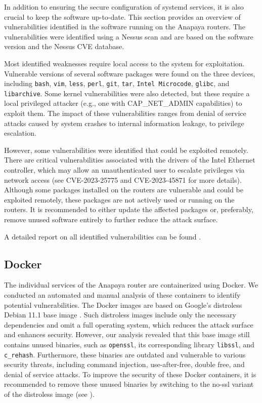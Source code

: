 In addition to ensuring the secure configuration of systemd services, it is also crucial to keep the software up-to-date.
This section provides an overview of vulnerabilities identified in the software running on the Anapaya routers.
The vulnerabilities were identified using a Nessus scan and are based on the software version and the Nessus CVE database.

Most identified weaknesses require local access to the system for exploitation.
Vulnerable versions of several software packages were found on the three devices, including \texttt{bash}, \texttt{vim}, \texttt{less}, \texttt{perl}, \texttt{git}, \texttt{tar}, \texttt{Intel Microcode}, \texttt{glibc}, and \texttt{libarchive}.
Some kernel vulnerabilities were also detected, but these require a local privileged attacker (e.g., one with CAP\_NET\_ADMIN capabilities) to exploit them.
The impact of these vulnerabilities ranges from denial of service attacks caused by system crashes to internal information leakage, to privilege escalation.

However, some vulnerabilities were identified that could be exploited remotely.
There are critical vulnerabilities associated with the drivers of the Intel Ethernet controller, which may allow an unauthenticated user to escalate privileges via network access (see CVE-2023-25775 and CVE-2023-45871 for more details).
Although some packages installed on the routers are vulnerable and could be exploited remotely, these packages are not actively used or running on the routers.
It is recommended to either update the affected packages or, preferably, remove unused software entirely to further reduce the attack surface.

A detailed report on all identified vulnerabilities can be found .



\subsection{Docker}

The individual services of the Anapaya router are containerized using Docker.
We conducted an automated and manual analysis of these containers to identify potential vulnerabilities.
The Docker images are based on Google's distroless Debian 11.1 base image \cite{githubGitHubGoogleContainerToolsdistroless}.
Such distroless images include only the necessary dependencies and omit a full operating system, which reduces the attack surface and enhances security.
However, our analysis revealed that this base image still contains unused binaries, such as \texttt{openssl}, its corresponding library \texttt{libssl}, and \texttt{c\_rehash}.
Furthermore, these binaries are outdated and vulnerable to various security threats, including command injection, use-after-free, double free, and denial of service attacks.
To improve the security of these Docker containers, it is recommended to remove these unused binaries by switching to the no-ssl variant of the distroless image (see \cite{githubGitHubGoogleContainerToolsdistroless}).


